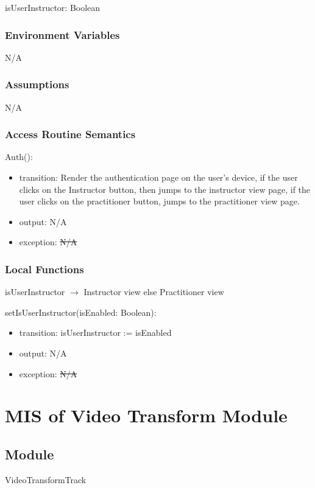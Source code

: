 \documentclass[12pt, titlepage]{article}
\newcommand{\rt}[1]{\textcolor{red}{#1}}
\begin{document}
isUserInstructor: Boolean

\subsubsection{Environment Variables}

N/A

\subsubsection{Assumptions}

N/A

\subsubsection{Access Routine Semantics}

\noindent Auth():
\begin{itemize}
\item transition: Render the authentication page on the user's device, if the user
  clicks on the Instructor button, then jumps to the instructor view page, if
  the user clicks on the practitioner button, jumps to the practitioner view
  page.
\item output: N/A
\item exception: \sout{N/A} \rt{}
\end{itemize}

\subsubsection{Local Functions}

\noindent isUserInstructor $\rightarrow$ Instructor view else Practitioner view

\noindent setIsUserInstructor(isEnabled: Boolean):
\begin{itemize}
  \item transition: isUserInstructor := isEnabled
  \item output: N/A
  \item exception: \sout{N/A} \rt{}
\end{itemize}

\section{MIS of Video Transform Module} \label{sec:videotransform}

\subsection{Module}
VideoTransformTrack
\end{document}

